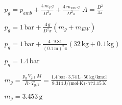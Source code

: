 \( p_g = p_{amb} + \frac{4 \, m_g \, g}{D^2 \pi} + \frac{4 \, m_{EW} \, g}{D^2 \pi} \)  
\( A = \frac{D^2}{4 \pi} \)  

\( p_g = 1 \, \text{bar} + \frac{4 \, g}{D^2 \pi} (m_g + m_{EW}) \)  

\( p_g = 1 \, \text{bar} + \frac{4 \cdot 9.81}{(0.1 \, \text{m})^2 \pi} (32 \, \text{kg} + 0.1 \, \text{kg}) \)  

\( p_g = 1.4 \, \text{bar} \)  

\( m_g = \frac{p_g \, V_{g,1} \, M}{R \cdot T_{g,1}} = \frac{1.4 \, \text{bar} \cdot 3.74 \, \text{L} \cdot 50 \, \text{kg/kmol}}{8.314 \, \text{J/(mol·K)} \cdot 773.15 \, \text{K}} \)  

\( m_g = 3.453 \, \text{g} \)
